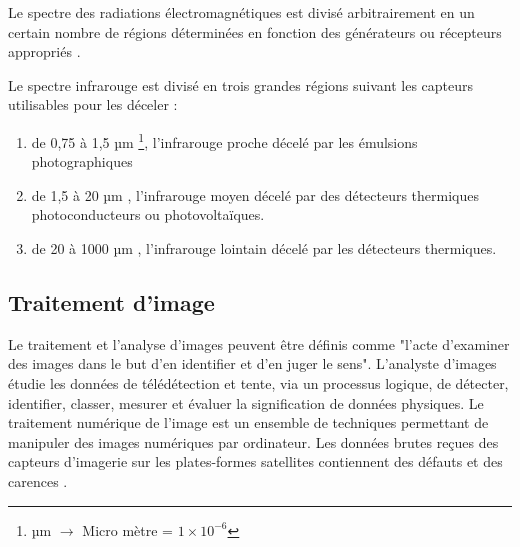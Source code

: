 \documentclass[12pt]{article}
\begin{document}
Le spectre des radiations électromagnétiques est divisé arbitrairement en un certain nombre de régions déterminées en fonction des générateurs ou récepteurs appropriés \cite{40}.

Le spectre infrarouge est divisé en trois grandes régions suivant les capteurs utilisables pour les déceler \cite{41}:
\begin{enumerate}
	\item de 0,75 à 1,5 µm \footnote{µm $\longrightarrow$ Micro mètre  = $1 \times 10^{-6}$}, l'infrarouge proche décelé par les émulsions photographiques
	\item de 1,5 à 20 µm , l'infrarouge moyen décelé par des détecteurs thermiques photoconducteurs ou photovoltaïques.
	\item de 20 à 1000 µm , l'infrarouge lointain décelé par les détecteurs thermiques.
\end{enumerate}

\subsection{Traitement d’image}
Le traitement et l'analyse d'images peuvent être définis comme "l'acte d'examiner des images dans le but d'en identifier et d'en juger le sens". L'analyste d'images étudie les données de télédétection et tente, via un processus logique, de détecter, identifier, classer, mesurer et évaluer la signification de données physiques. Le traitement numérique de l'image est un ensemble de techniques permettant de manipuler des images numériques par ordinateur. Les données brutes reçues des capteurs d’imagerie sur les plates-formes satellites contiennent des défauts et des carences \cite{14}.
\end{document}
